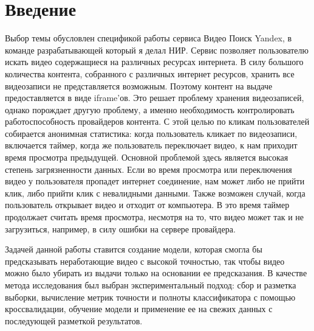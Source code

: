 




\chapter{Введение}

Выбор темы обусловлен спецификой работы сервиса Видео Поиск Yandex, в команде разрабатывающей который я делал НИР. Сервис позволяет пользователю искать видео содержащиеся на различных ресурсах интернета. В силу большого количества контента, собранного с различных интернет ресурсов, хранить все видеозаписи не представляется возможным. Поэтому контент на выдаче предоставляется в виде iframe'ов. Это решает проблему хранения видеозаписей, однако порождает другую проблему, а именно необходимость контролировать работоспособность провайдеров контента. С этой целью по кликам пользователей собирается анонимная статистика: когда пользователь кликает по видеозаписи, включается таймер, когда же пользователь переключает видео, к нам приходит время просмотра предыдущей. Основной проблемой здесь является высокая степень загрязненности данных. Если во время просмотра или переключения видео у пользователя пропадет интернет соединение, нам может либо не прийти клик, либо прийти клик с невалидными данными. Также возможен случай, когда пользователь открывает видео и отходит от компьютера. В это время таймер продолжает считать время просмотра, несмотря на то, что видео может так и не загрузиться, например, в силу ошибки на сервере провайдера.

Задачей данной работы ставится создание модели, которая смогла бы предсказывать неработающие видео с высокой точностью, так чтобы видео можно было убирать из выдачи только на основании ее предсказания. В качестве метода исследования был выбран экспериментальный подход: сбор и разметка выборки, вычисление метрик точности и полноты классификатора с помощью кроссвалидации, обучение модели и применение ее на свежих данных с последующей разметкой результатов.